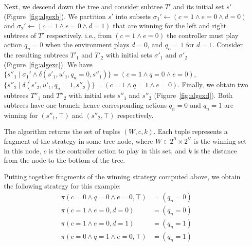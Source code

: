 Next, we descend down the tree and consider subtree $T'$ and its initial set $s'$ (Figure~\ref{fig:algexb}).  We partition $s'$ into subsets $\sigma_1' \gets (c = 1 \land e = 0 \land d = 0)$ and $\sigma_2' \gets (c = 1 \land e = 0 \land d = 1)$ that are winning for the left and right subtrees of $T'$ respectively, i.e., from $(c = 1 \land e = 0)$ the controller must play action $q_n = 0$ when the environment plays $d = 0$, and $q_n = 1$ for $d = 1$.  Consider the resulting subtrees $T'_1$ and $T'_2$ with initial sets $\sigma'_1$ and $\sigma'_2$ (Figure~\ref{fig:algexc}).  We have $\{ s''_1 \mid \sigma_1' \land \delta(s'_1, u'_1, q_n = 0, s''_1) \} = (c = 1 \land q = 0 \land e = 0)$, $\{ s''_2 \mid \delta(s'_2, u'_1, q_n = 1, s''_2) \} = (c = 1 \land q = 1 \land e = 0)$.  Finally, we obtain two subtrees $T''_1$ and $T''_2$ with initial sets $s''_1$ and $s''_2$ (Figure~\ref{fig:algexd}).  Both subtrees have one branch; hence corresponding actions $q_n = 0$ and $q_n = 1$ are winning for $(s''_1, \top)$ and $(s''_2, \top)$ respectively.

The algorithm returns the set of tuples $(W, c, k)$.  Each tuple represents a fragment of the strategy in some tree node, where $W \in 2^{\mathcal{S}} \times 2^{\mathcal{U}}$ is the winning set in this node, $c$ is the controller action to play in this set, and $k$ is the distance from the node to the bottom of the tree.

Putting together fragments of the winning strategy computed above, we obtain the following strategy for this example:
\begin{align*}
    \pi(c = 0 \land q = 0 \land e = 0, \top) &= (q_n = 0) \\
    \pi(c = 1 \land e = 0, d = 0) &= (q_n = 0) \\
    \pi(c = 1 \land e = 0, d = 1) &= (q_n = 1) \\
    \pi(c = 0 \land q = 1 \land e = 0, \top) &= (q_n = 1)
\end{align*}





